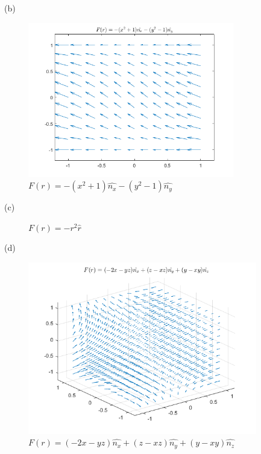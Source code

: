 \documentclass{article}
\begin{document}
	(b)
	\begin{figure}[h!]
		\centering
		\includegraphics[width=9cm]{p9_2.png}
		\caption{$F(r)=-(x^2+1)\hat{n_x}-(y^2-1)\hat{n_y}$}
		\label{fig-9-b}
	\end{figure}
	
	\newpage	
	
	(c)
	\begin{figure}[h!]
		\centering
		\caption{$F(r)=-r^2\hat{r}$}
		\label{fig-sample}
	\end{figure}

	(d)
	\begin{figure}[h!]
		\centering
		\includegraphics[width=10cm]{p9_5.png}
		\caption{$F(r)=(-2x-yz)\hat{n_x}+(z-xz)\hat{n_y}+(y-xy)\hat{n_z}$}
		\label{fig-9-d}
	\end{figure}
\end{document}
